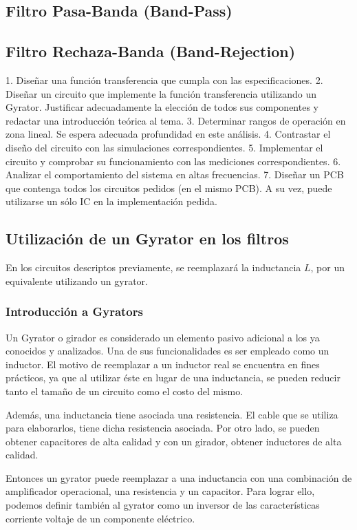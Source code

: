 \subsection{Filtro Pasa-Banda (Band-Pass)}
\subsection{Filtro Rechaza-Banda (Band-Rejection)}

1. Diseñar una función transferencia que cumpla con las especificaciones.
2. Diseñar un circuito que implemente la función transferencia utilizando un Gyrator. Justificar adecuadamente la elección de todos sus componentes y redactar una introducción teórica al tema.
3. Determinar rangos de operación en zona lineal. Se espera adecuada profundidad en este análisis.
4. Contrastar el diseño del circuito con las simulaciones correspondientes.
5. Implementar el circuito y comprobar su funcionamiento con las mediciones correspondientes.
6. Analizar el comportamiento del sistema en altas frecuencias.
7. Diseñar un PCB que contenga todos los circuitos pedidos (en el mismo PCB). A su vez, puede utilizarse un
sólo IC en la implementación pedida.

\subsection{Utilización de un Gyrator en los filtros}

En los circuitos descriptos previamente, se reemplazará la inductancia $L$, por un equivalente utilizando
un gyrator. 

\subsubsection{Introducción a Gyrators}

Un Gyrator o girador es considerado un elemento pasivo adicional a los ya conocidos y analizados. Una de sus funcionalidades es ser empleado como un inductor. 
El motivo de reemplazar a un inductor real se encuentra en fines prácticos, ya que al utilizar éste en lugar de una inductancia, se pueden reducir tanto el tamaño de un circuito
como el costo del mismo. 

Además, una inductancia tiene asociada una resistencia. El cable que se utiliza para elaborarlos, tiene dicha resistencia asociada. 
Por otro lado, se pueden obtener capacitores de alta calidad y con un girador, obtener inductores de alta calidad.

Entonces un gyrator puede reemplazar a una inductancia con una combinación de amplificador operacional, una resistencia y un capacitor.
Para lograr ello, podemos definir también al gyrator como un inversor de las características corriente voltaje de un componente eléctrico.

